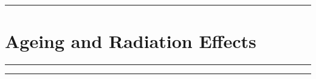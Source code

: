 
\noindent\rule{7in}{2.8pt}
\section{Ageing and Radiation Effects}
    
\begin{problem}{12.1}

\end{problem}
\begin{solution}

\end{solution}

\noindent\rule{7in}{1.5pt}


\begin{problem}{12.2}

\end{problem}
\begin{solution}

\end{solution}

\noindent\rule{7in}{1.5pt}

